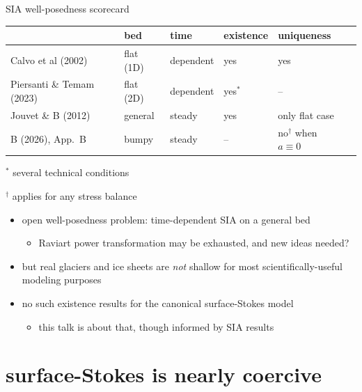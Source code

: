 \documentclass[aspectratio=169,10pt]{beamer}
\newcommand{\lc}{{\text{\large $\circ$}}}
\begin{document}
\begin{frame}{SIA well-posedness scorecard}

\begin{center}
\setlength{\tabcolsep}{5pt}
\begin{tabular}{llllll}
 & bed & time & existence & uniqueness \\
\midrule
Calvo et al (2002) & flat (1D) & dependent & yes & yes \\
Piersanti \& Temam (2023) & flat (2D) & dependent & yes$^*$ & -- \\
Jouvet \& B (2012) & general & steady & yes & only flat case \\ \hline
B (2026), App.~B & bumpy & steady & -- & \alert{no}$^\dagger$ when $a\equiv 0$ \\
\midrule
\end{tabular}
\end{center}

\vspace{-2mm}
{\hfill \footnotesize $^*$ several technical conditions}

{\hfill \footnotesize $^\dagger$ applies for any stress balance}

\smallskip
\begin{itemize}
\item open well-posedness problem: time-dependent SIA on a general bed
    \begin{itemize}
    \item[$\lc$] Raviart power transformation may be exhausted, and new ideas needed?
    \end{itemize}

\pause
\medskip
\item but real glaciers and ice sheets are \emph{not} shallow for most scientifically-useful modeling purposes
\item \alert{no such existence results for the canonical surface-Stokes model}
    \begin{itemize}
    \item[$\lc$] this talk is about that, though informed by SIA results
    \end{itemize}
\end{itemize}
\end{frame}


\section{surface-Stokes is nearly coercive}
\end{document}
